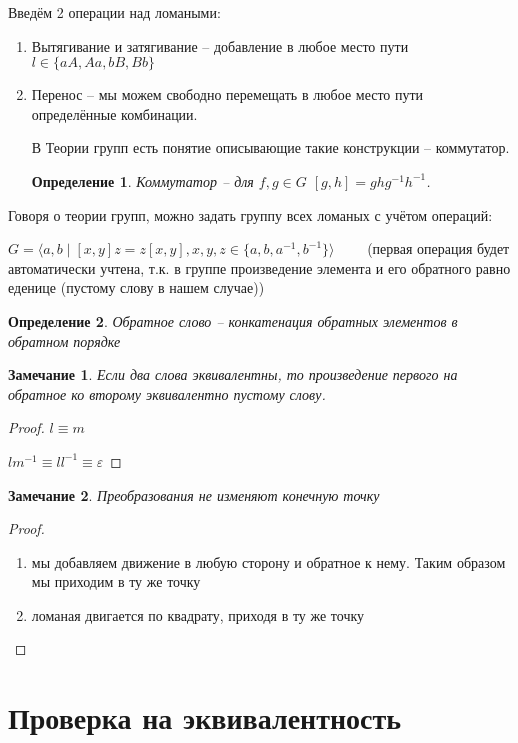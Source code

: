 \documentclass[12pt,a4paper, flushleft]{article}
\newtheorem{Def}{Определение}[section]
\newtheorem{Zm}{Замечание}[section]
\begin{document}
Введём 2 операции над ломаными:
\begin{enumerate}
	\item Вытягивание и затягивание -- добавление в любое место пути $l\in\{aA, Aa, bB, Bb\}$
	\item Перенос -- мы можем свободно перемещать в любое место пути определённые комбинации. 
	
	В Теории групп есть понятие описывающие такие конструкции -- коммутатор.
	\begin{Def}
		Коммутатор -- для $f, g\in G$  $ [g, h] = ghg^{-1}h^{-1}$. 
	\end{Def}
\end{enumerate}

Говоря о теории групп, можно задать группу всех ломаных с учётом операций:

$G =\langle a, b\mid [x, y]z = z[x, y], x, y, z\in \{a, b, a^{-1}, b^{-1}\}\rangle\quad\quad $ (первая операция будет автоматически учтена, т.к. в группе произведение элемента и его обратного равно еденице (пустому слову в нашем случае))

\begin{Def}
	Обратное слово -- конкатенация обратных элементов в обратном порядке
\end{Def}

\begin{Zm}
	Если два слова эквивалентны, то произведение первого на обратное ко второму эквивалентно пустому слову. 
\end{Zm}
\begin{proof}
	$l\equiv m$
	
	$lm^{-1} \equiv ll^{-1}\equiv \varepsilon$
\end{proof}

\begin{Zm}
	Преобразования не изменяют  конечную точку
\end{Zm}
\begin{proof}
\begin{enumerate}
	\item мы добавляем движение в любую сторону и обратное к нему. Таким образом мы приходим в ту же точку
	\item ломаная двигается по квадрату, приходя в ту же точку
\end{enumerate}
\end{proof}
\section{Проверка на эквивалентность}
\end{document}
